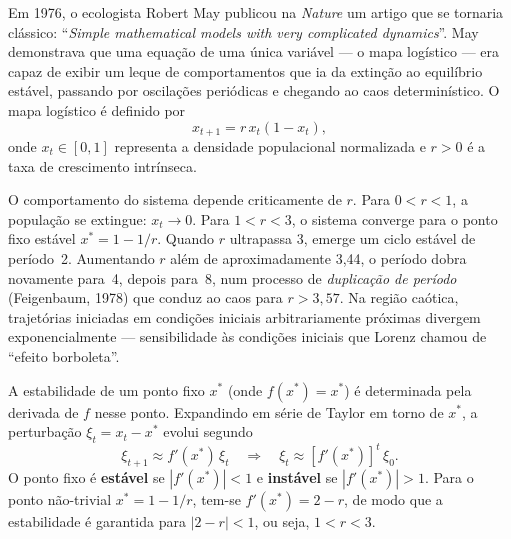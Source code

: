 Em 1976, o ecologista Robert May publicou na \textit{Nature} um artigo que se tornaria
clássico: ``\textit{Simple mathematical models with very complicated dynamics}''. May
demonstrava que uma equação de uma única variável --- o mapa logístico --- era capaz de
exibir um leque de comportamentos que ia da extinção ao equilíbrio estável, passando por
oscilações periódicas e chegando ao caos determinístico. O mapa logístico é definido por
\begin{equation}
  x_{t+1} = r\, x_t(1 - x_t),
\end{equation}
onde $x_t \in [0,1]$ representa a densidade populacional normalizada e $r > 0$ é a taxa de
crescimento intrínseca.

O comportamento do sistema depende criticamente de $r$. Para $0 < r < 1$, a população se
extingue: $x_t \to 0$. Para $1 < r < 3$, o sistema converge para o ponto fixo estável
$x^* = 1 - 1/r$. Quando $r$ ultrapassa 3, emerge um ciclo estável de período~2. Aumentando
$r$ além de aproximadamente 3{,}44, o período dobra novamente para~4, depois para~8, num
processo de \emph{duplicação de período} (Feigenbaum, 1978) que conduz ao caos para
$r > 3{,}57$. Na região caótica, trajetórias iniciadas em condições iniciais arbitrariamente
próximas divergem exponencialmente --- sensibilidade às condições iniciais que Lorenz chamou
de ``efeito borboleta''.

A estabilidade de um ponto fixo $x^*$ (onde $f(x^*) = x^*$) é determinada pela derivada de
$f$ nesse ponto. Expandindo em série de Taylor em torno de $x^*$, a perturbação
$\xi_t = x_t - x^*$ evolui segundo
\begin{equation}
  \xi_{t+1} \approx f'(x^*)\,\xi_t
  \quad\Rightarrow\quad
  \xi_t \approx [f'(x^*)]^t\,\xi_0.
\end{equation}
O ponto fixo é \textbf{estável} se $|f'(x^*)| < 1$ e \textbf{instável} se $|f'(x^*)| > 1$.
Para o ponto não-trivial $x^* = 1 - 1/r$, tem-se $f'(x^*) = 2 - r$, de modo que a
estabilidade é garantida para $|2 - r| < 1$, ou seja, $1 < r < 3$.

